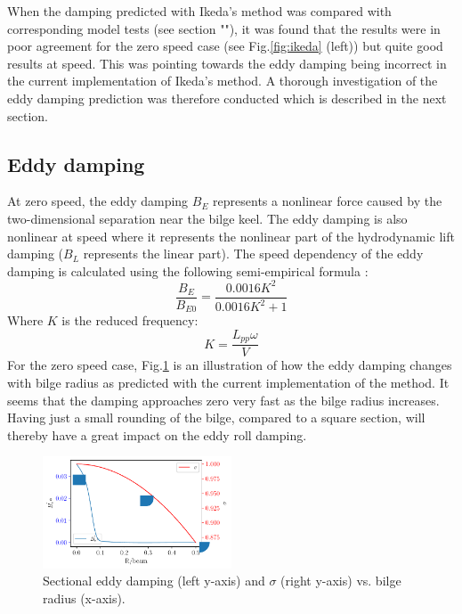 When the damping predicted with Ikeda's method was compared with
corresponding model tests (see section ""), it
was found that the results were in poor agreement for the zero speed
case (see Fig.\ref{fig:ikeda} (left)) but quite good results at
speed. This was pointing towards the eddy damping being incorrect in the
current implementation of Ikeda's method. A thorough investigation of
the eddy damping prediction was therefore conducted which is described
in the next section.
\subsection*{Eddy damping}\label{eddy-damping}
At zero speed, the eddy damping $B_E$ represents a nonlinear force
caused by the two-dimensional separation near the bilge keel. The eddy
damping is also nonlinear at speed where it represents the nonlinear
part of the hydrodynamic lift damping ($B_L$ represents the linear
part). The speed dependency of the eddy damping is calculated using the
following semi-empirical formula \citep{7505983/937PN5DT}:
\begin{equation}
\frac{B_{E}}{B_{E0}} = \frac{0.0016 K^{2}}{0.0016 K^{2} + 1}
\label{eq:eddy_speed}
\end{equation}
Where $K$ is the reduced frequency:
\begin{equation}
K = \frac{L_{pp} \omega}{V}
\label{eq:K}
\end{equation}
For the zero speed case, Fig.\ref{fig:eddy_sigma} is an
illustration of how the eddy damping changes with bilge radius as
predicted with the current implementation of the method. It seems that
the damping approaches zero very fast as the bilge radius increases.
Having just a small rounding of the bilge, compared to a square section,
will thereby have a great impact on the eddy roll damping.
\begin{figure}[H]
\begin{center}\includegraphics[width = 0.5\textwidth]{figures/eddy_sigma.pdf}\end{center}
\vspace{-1cm}
\caption{Sectional eddy damping (left y-axis) and $\sigma$ (right y-axis) vs. bilge radius (x-axis).}
\label{fig:eddy_sigma}
\end{figure}
